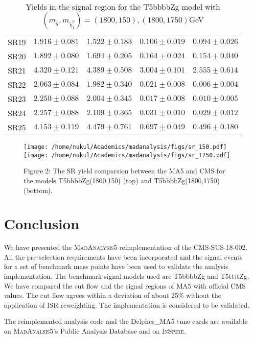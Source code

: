 \documentclass[a4paper, 10pt]{article}
\begin{document}
\begin{table}
\begin{center}
\begin{tabular}{c || c | c || c | c }
 SR19 & $1.916 \pm 0.081$ & $1.522 \pm 0.183$ & $0.106 \pm 0.019$ & $0.094 \pm 0.026$ \\
 SR20 & $1.892 \pm 0.080$ & $1.694 \pm 0.205$ & $0.164 \pm 0.024$ & $0.154 \pm 0.040$ \\
 SR21 & $4.320 \pm 0.121$ & $4.389 \pm 0.508$ & $3.004 \pm 0.101$ & $2.555 \pm 0.614$ \\
 SR22 & $2.063 \pm 0.084$ & $1.982 \pm 0.340$ & $0.021 \pm 0.008$ & $0.006 \pm 0.004$ \\
 SR23 & $2.250 \pm 0.088$ & $2.004 \pm 0.345$ & $0.017 \pm 0.008$ & $0.010 \pm 0.005$ \\
 SR24 & $2.257 \pm 0.088$ & $2.109 \pm 0.365$ & $0.031 \pm 0.010$ & $0.029 \pm 0.012$ \\
 SR25 & $4.153 \pm 0.119$ & $4.479 \pm 0.761$ & $0.697 \pm 0.049$ & $0.496 \pm 0.180$ \\
\hline \hline	

\end{tabular}  
\caption{Yields in the signal region for the T5bbbbZg model with $(m_{\tilde{g}},m_{\tilde{\chi}_{1}^{0}}) = (1800,150) , (1800,1750)$GeV}
\label{table:3}  
\end{center}
\end{table}

\begin{figure}[h] 

\centering 
\texttt{[image: /home/nukul/Academics/madanalysis/figs/sr\_150.pdf]}
\texttt{[image: /home/nukul/Academics/madanalysis/figs/sr\_1750.pdf]}
\caption{Figure 2: The SR yield comparsion between the MA5 and CMS for the models T5bbbbZg(1800,150) (top) and T5bbbbZg(1800,1750) (bottom).   }
\end{figure}

\section{Conclusion}
We have presented the \textsc{MadAnalysis5} reimplementation of the CMS-SUS-18-002. All the pre-selection requirements have been incorporated and the signal events for a set of benchmark mass points have been used to validate the analysis implementation. The benchmark signal models used are T5bbbbZg and T5ttttZg. We have compared the cut flow and the signal regions of MA5 with official CMS values. The cut flow agrees within a deviation of about 25\% without the application of ISR reweighting. The implementation is considered to be validated.   

The reimplemented analysis code and the Delphes\_MA5 tune cards are available on \textsc{MadAnalsis5}'s Public Analysis Database and on \textsc{InSpire}.    



\newpage





 
\end{document}
